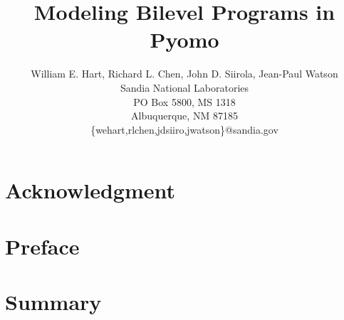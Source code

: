 \documentclass[relax,pdf,12pt,article]{SANDreport}
\title{Modeling Bilevel Programs in Pyomo}
\author{William E. Hart, Richard L. Chen, John D. Siirola, Jean-Paul Watson\\
           Sandia National Laboratories\\
           PO Box 5800, MS 1318 \\
           Albuquerque, NM 87185 \\
           \{wehart,rlchen,jdsiiro,jwatson\}@sandia.gov
           }
\date{}
\begin{document}

    \maketitle

    \begin{abstract}
	
    \end{abstract}


    \clearpage
    \section*{Acknowledgment}
	


    \cleardoublepage		%
    \tableofcontents


    \clearpage
    \section*{Preface}
	
    \fi


    \clearpage
    \section*{Summary}
	
    \fi
\end{document}
